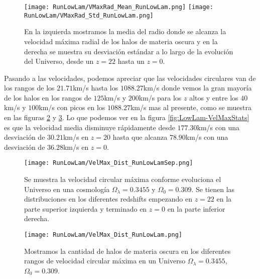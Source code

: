 \begin{figure}[H]
    \centering
    \texttt{[image: RunLowLam/VMaxRad\_Mean\_RunLowLam.png]}
    \texttt{[image: RunLowLam/VMaxRad\_Std\_RunLowLam.png]}
    \caption[Media y desviación estándar del Radio donde se alcanza la velocidad máxima radial de un Universo $\Omega_\lambda = 0.3455$, $\Omega_0 = 0.309$]{\footnotesize En la izquierda mostramos la media del radio donde se alcanza la velocidad máxima radial de los halos de materia oscura y en la derecha se muestra su desviación estándar a lo largo de la evolución del Universo, desde un $z=22$ hasta un $z=0$.}
    \label{fig:LowLam-VMaxRadStats}
\end{figure}

Pasando a las velocidades, podemos apreciar que las velocidades circulares van de los rangos de los $21.71$km/s hasta los $1088.27$km/s donde vemos la gran mayoría de los halos en los rangos de $125$km/s y $200$km/s para los $z$ altos y entre los $40$km/s y $100$km/s con picos en los $1088.27$km/s mas al presente, como se muestra en las figuras \ref{fig:LowLam-VelMaxDistSep} y \ref{fig:LowLam-VelMaxDist}. Lo que podemos ver en la figura \ref{fig:LowLam-VelMaxStats} es que la velocidad media disminuye rápidamente desde $177.30$km/s con una desviación de $30.21$km/s en $z=20$ hasta que alcanza $78.90$km/s con una desviación de $36.28$km/s en $z=0$.

\begin{figure}[H]
    \centering
    \texttt{[image: RunLowLam/VelMax\_Dist\_RunLowLamSep.png]}
    \caption[Velocidad circular máxima en la evolución de un Universo $\Omega_\lambda = 0.3455$, $\Omega_0 = 0.309$]{\footnotesize Se muestra la velocidad circular máxima conforme evoluciona el Universo en una cosmología $\Omega_\lambda = 0.3455$ y $\Omega_0 = 0.309$. Se tienen las distribuciones en los diferentes redshifts empezando en $z=22$ en la parte superior izquierda y terminado en $z=0$ en la parte inferior derecha.}
    \label{fig:LowLam-VelMaxDistSep}
\end{figure}

\begin{figure}[H]
    \centering
    \texttt{[image: RunLowLam/VelMax\_Dist\_RunLowLam.png]}
    \caption[Distribución de la velocidad circular máxima de un Universo $\Omega_\lambda = 0.3455$, $\Omega_0 = 0.309$]{\footnotesize Mostramos la cantidad de halos de materia oscura en los diferentes rangos de velocidad circular máxima en un Universo $\Omega_\lambda = 0.3455$, $\Omega_0 = 0.309$.}
    \label{fig:LowLam-VelMaxDist}
\end{figure}

